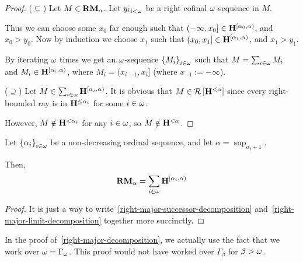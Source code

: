 \begin{proof}
  ($\subseteq$) Let $M \in \mathbf{RM}_{\alpha}$.
  Let ${y_i}_{i < \omega}$ be a right cofinal $\omega$-sequence in $M$.

  Thus we can choose some $x_0$ far enough such that $(-\infty, x_0] \in \mathbf{H}_{}^{[\alpha_0, \alpha)}$,
          and $x_0 > y_0$.
          Now by induction we choose $x_1$ such that $(x_0, x_1] \in \mathbf{H}_{}^{[\alpha_1, \alpha)}$,
  and $x_1 > y_1$.

  By iterating $\omega$ times we get an $\omega$-sequence $\left\{ {M_i} \right\}_{i \in \omega}$
  such that $M = \sum_{i \in \omega} M_i$ and $M_i \in \mathbf{H}_{}^{[\alpha_i, \alpha)}$,
          where $M_i = (x_{i-1}, x_i]$ (where $x_{-1} := -\infty$).


  ($\supseteq$) Let $M \in \sum_{i \in \omega}{\mathbf{H}_{}^{[\alpha_i, \alpha)}}$.
  It is obvious that $M \in \mathcal{R} \left[ {{\mathbf{H}_{}^{< \alpha}}} \right]$ since every right-bounded
  ray is in $\mathbf{H}_{}^{\le \alpha_i}$ for some $i \in \omega$.

  However, $M \notin \mathbf{H}_{}^{< \alpha_i}$ for any $i \in \omega$, so $M \notin \mathbf{H}_{}^{< \alpha}$.


\end{proof}

\begin{lemma}\label{right-major-decomposition}
  Let $\left\{ {\alpha_i} \right\}_{i \in \omega}$ be a non-decreasing ordinal sequence,
  and let $\alpha = \sup_{\alpha_i + 1}$.

  Then,
  \[
    \mathbf{RM}_{\alpha} = \sum_{i \in \omega}{\mathbf{H}_{}^{[\alpha_i, \alpha)}}
  \]
\end{lemma}

\begin{proof}
  It is just a way to
  write~\cref{right-major-successor-decomposition}
  and~\cref{right-major-limit-decomposition}
  together more succinctly.
\end{proof}

\begin{note}
  In the proof of~\cref{right-major-decomposition}, we actually use the fact that
  we work over $\omega = \Gamma_{\omega}$. This proof would not have worked over $\Gamma_{\beta}$
  for $\beta > \omega$.
\end{note}
